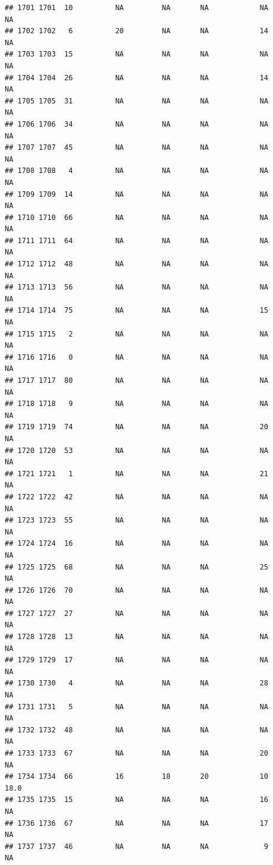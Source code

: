 \documentclass[man]{apa6}
\begin{document}
\begin{verbatim}
## 1701 1701  10          NA         NA       NA            NA       NA
## 1702 1702   6          20         NA       NA            14       NA
## 1703 1703  15          NA         NA       NA            NA       NA
## 1704 1704  26          NA         NA       NA            14       NA
## 1705 1705  31          NA         NA       NA            NA       NA
## 1706 1706  34          NA         NA       NA            NA       NA
## 1707 1707  45          NA         NA       NA            NA       NA
## 1708 1708   4          NA         NA       NA            NA       NA
## 1709 1709  14          NA         NA       NA            NA       NA
## 1710 1710  66          NA         NA       NA            NA       NA
## 1711 1711  64          NA         NA       NA            NA       NA
## 1712 1712  48          NA         NA       NA            NA       NA
## 1713 1713  56          NA         NA       NA            NA       NA
## 1714 1714  75          NA         NA       NA            15       NA
## 1715 1715   2          NA         NA       NA            NA       NA
## 1716 1716   0          NA         NA       NA            NA       NA
## 1717 1717  80          NA         NA       NA            NA       NA
## 1718 1718   9          NA         NA       NA            NA       NA
## 1719 1719  74          NA         NA       NA            20       NA
## 1720 1720  53          NA         NA       NA            NA       NA
## 1721 1721   1          NA         NA       NA            21       NA
## 1722 1722  42          NA         NA       NA            NA       NA
## 1723 1723  55          NA         NA       NA            NA       NA
## 1724 1724  16          NA         NA       NA            NA       NA
## 1725 1725  68          NA         NA       NA            25       NA
## 1726 1726  70          NA         NA       NA            NA       NA
## 1727 1727  27          NA         NA       NA            NA       NA
## 1728 1728  13          NA         NA       NA            NA       NA
## 1729 1729  17          NA         NA       NA            NA       NA
## 1730 1730   4          NA         NA       NA            28       NA
## 1731 1731   5          NA         NA       NA            NA       NA
## 1732 1732  48          NA         NA       NA            NA       NA
## 1733 1733  67          NA         NA       NA            20       NA
## 1734 1734  66          16         18       20            10     18.0
## 1735 1735  15          NA         NA       NA            16       NA
## 1736 1736  67          NA         NA       NA            17       NA
## 1737 1737  46          NA         NA       NA             9       NA

\end{verbatim}
\end{document}
